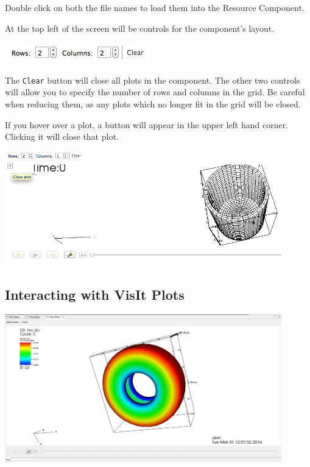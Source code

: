 \documentclass{article}
\begin{document}
Double click on both the file names to load them into the Resource Component.

At the top left of the screen will be controls for the component's layout.

\begin{center}
\includegraphics{images/ResourceComponentControls}
\end{center}

The \texttt{Clear} button will close all plots in the component. The other two
controls will allow you to specify the number of rows and columns in the grid.
Be careful when reducing them, as any plots which no longer fit in the grid will
be closed.

If you hover over a plot, a button will appear in the upper left hand corner.
Clicking it will close that plot. 

\begin{center}
\includegraphics[width=12cm]{images/ClosePlotButton}
\end{center}

\subsection{Interacting with VisIt Plots}

\begin{center}
\includegraphics[width=12cm]{images/VisItPlot}
\end{center}
\end{document}
